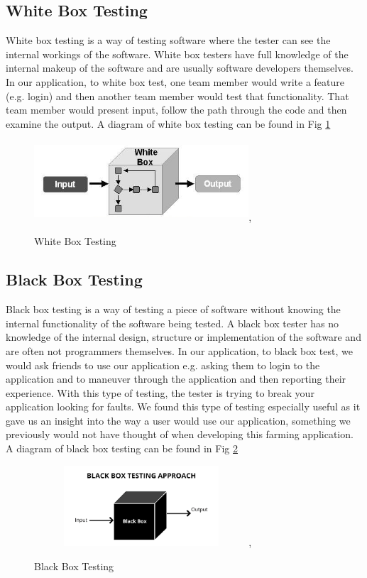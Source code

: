 \documentclass[12pt,a4paper,oneside,openany]{book}
\begin{document}
\subsection{White Box Testing}
White box testing is a way of testing software where the tester can see the internal workings of the software. White box testers have full knowledge of the internal makeup of the software and are usually software developers themselves. In our application, to white box test, one team member would write a feature (e.g. login) and then another team member would test that functionality. That team member would present input, follow the path through the code and then examine the output. A diagram of white box testing can be found in Fig \ref{white_box} \\
\begin{figure}[ht]
\renewcommand\thefigure{3.1}
\centering
\includegraphics[width=8cm, height=3cm]{Images/whitebox.jpg},
\caption{White Box Testing}
\label{white_box}
\end{figure}


\subsection{Black Box Testing}
Black box testing is a way of testing a piece of software without knowing the internal functionality of the software being tested. A black box tester has no knowledge of the internal design, structure or implementation of the software and are often not programmers themselves. In our application, to black box test, we would ask friends to use our application e.g. asking them to login to the application and to maneuver through the application and then reporting their experience. With this type of testing, the tester is trying to break your application looking for faults. We found this type of testing especially useful as it gave us an insight into the way a user would use our application, something we previously would not have thought of when developing this farming application. A diagram of black box testing can be found in Fig \ref{black_box} 

\begin{figure}[ht]
\renewcommand\thefigure{3.2}
\centering
\includegraphics[width=8cm, height=3cm]{Images/blackbox.png},
\caption{Black Box Testing}
\label{black_box}
\end{figure} 
\end{document}
